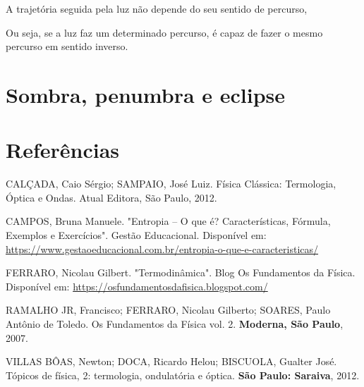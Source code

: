 \documentclass[11pt,twocolumn,oneside]{article}
\begin{document}
A trajetória seguida pela luz não depende do seu sentido de percurso,


Ou seja, se a luz faz um determinado percurso, é capaz de fazer o mesmo percurso em sentido inverso.


\hypertarget{x-sombra,-penumbra-e-eclipse}{\section{Sombra, penumbra e eclipse}}

\hypertarget{x-referências}{\section{Referências}}
CALÇADA, Caio Sérgio; SAMPAIO, José Luiz. Física Clássica: Termologia, Óptica e Ondas. Atual Editora, São Paulo, 2012.


CAMPOS, Bruna Manuele. "Entropia – O que é? Características, Fórmula, Exemplos e Exercícios". Gestão Educacional. Disponível em: \href{https://www.gestaoeducacional.com.br/entropia-o-que-e-caracteristicas/}{https://www.gestaoeducacional.com.br/entropia-o-que-e-caracteristicas/}


FERRARO, Nicolau Gilbert. "Termodinâmica". Blog Os Fundamentos da Física. Disponível em: \href{https://osfundamentosdafisica.blogspot.com/}{https://osfundamentosdafisica.blogspot.com/}


RAMALHO JR, Francisco; FERRARO, Nicolau Gilberto; SOARES, Paulo Antônio de Toledo. Os Fundamentos da Física vol. 2. \textbf{Moderna, São Paulo}, 2007.


VILLAS BÔAS, Newton; DOCA, Ricardo Helou; BISCUOLA, Gualter José. Tópicos de física, 2: termologia, ondulatória e óptica. \textbf{São Paulo: Saraiva}, 2012.
\end{document}
